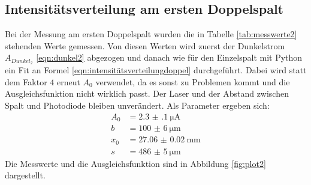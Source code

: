\documentclass[
  bibliography=totoc,     %
  captions=tableheading,  %
  titlepage=firstiscover, %
]{scrartcl}
\begin{document}
\subsection{Intensitätsverteilung am ersten Doppelspalt}
Bei der Messung am ersten Doppelspalt wurden die in Tabelle \ref{tab:messwerte2}
stehenden Werte gemessen. Von diesen Werten wird zuerst der Dunkelstrom
$A_{Dunkel_2}$ \eqref{eqn:dunkel2} abgezogen und danach wie für den
Einzelspalt mit Python ein Fit an Formel \eqref{eqn:intensitätsverteilungdoppel}
durchgeführt. Dabei wird statt dem Faktor $4$ erneut $A_0$ verwendet, da
es sonst zu Problemen kommt und die Ausgleichsfunktion nicht wirklich passt.
Der Laser und der Abstand zwischen Spalt und Photodiode bleiben unverändert.
Als Parameter ergeben sich:
\begin{align}
  A_0 &= \SI{2.3(1)}{\micro\ampere}\\
  b &= \SI{100(6)}{\micro\meter}\\
  x_0 &= \SI{27.06(2)}{\milli\meter}\\
  s &= \SI{486(5)}{\micro\meter}
\end{align}
Die Messwerte und die Ausgleichsfunktion sind in Abbildung \ref{fig:plot2}
dargestellt.
\end{document}
